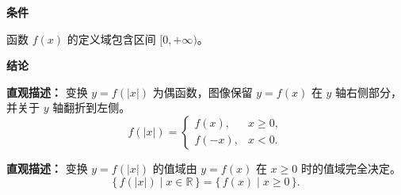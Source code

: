 \begin{statementbox}

	\textbf{\textcolor{CStatement}{条件}}
	\begin{description}[style=nextline, leftmargin=2.8em, labelsep=0.5em, itemsep=0.35em]
		\item[\textbf{\textcolor{CStatement}{条件 1（定义域限制）：}}]
		      函数 $f(x)$ 的定义域包含区间 $[0,+\infty)$。
	\end{description}

	\textbf{\textcolor{CStatement}{结论}}
	\begin{description}[style=nextline, leftmargin=2.8em, labelsep=0.5em, itemsep=0.45em]
		\item[\textbf{\textcolor{CStatement}{结论一（翻折变换）：}}]
		      \textbf{\textcolor{CStatement}{直观描述：}}
		      变换 $y=f(|x|)$ 为偶函数，图像保留 $y=f(x)$ 在 $y$ 轴右侧部分，并关于 $y$ 轴翻折到左侧。
		      \[
			      \boxed{
				      f(|x|)=
				      \begin{cases}
					      f(x),  & x\ge 0, \\[2pt]
					      f(-x), & x<0.
				      \end{cases}
			      }
		      \]

		\item[\textbf{\textcolor{CStatement}{推广结论（值域不变性）：}}]
		      \textbf{\textcolor{CStatement}{直观描述：}}
		      变换 $y=f(|x|)$ 的值域由 $y=f(x)$ 在 $x\ge 0$ 时的值域完全决定。
		      \[
			      \{\,f(|x|)\mid x\in\mathbb{R}\,\}
			      =
			      \{\,f(x)\mid x\ge 0\,\}.
		      \]
	\end{description}
\end{statementbox}